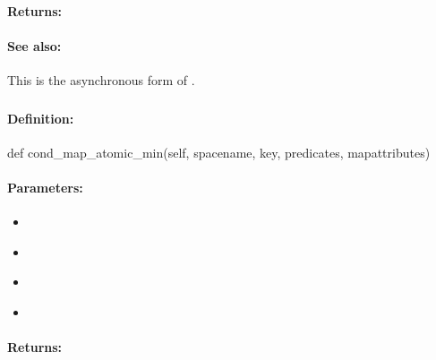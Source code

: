 \paragraph{Returns:}


\paragraph{See also:}  This is the asynchronous form of .

\pagebreak
\subsubsection{}
\label{api:python:cond_map_atomic_min}


\paragraph{Definition:}
\begin{pythoncode}
def cond_map_atomic_min(self, spacename, key, predicates, mapattributes)
\end{pythoncode}

\paragraph{Parameters:}
\begin{itemize}[noitemsep]
\item {}\\

\item {}\\

\item {}\\

\item {}\\

\end{itemize}

\paragraph{Returns:}


